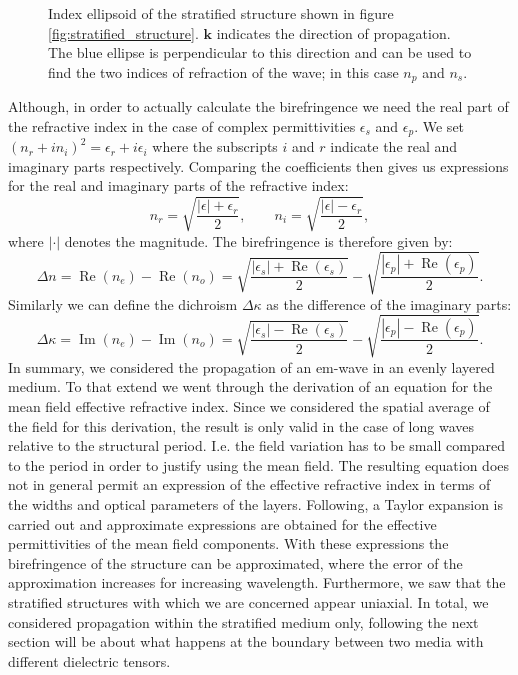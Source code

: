 \begin{figure}[h]
    \centering
    
    \caption{Index ellipsoid of the stratified structure shown in figure \ref{fig:stratified_structure}. $\bm{k}$ indicates the direction of propagation. The blue ellipse is perpendicular to this direction and can be used to find the two indices of refraction of the wave; in this case $n_{p}$ and $n_{s}$.}
    \label{fig:index_ellipse}
\end{figure}
Although, in order to actually calculate the birefringence we need the real part of the refractive index in the case of complex permittivities $\epsilon_{s}$ and $\epsilon_{p}$. We set $(n_r+in_i)^2 = \epsilon_r + i\epsilon_i$ where the subscripts $i$ and $r$ indicate the real and imaginary parts respectively. Comparing the coefficients then gives us expressions for the real and imaginary parts of the refractive index:
\begin{equation}
    n_r = \sqrt{\frac{|\epsilon|+\epsilon_r}{2}}, 
    \qquad 
    n_i = \sqrt{\frac{|\epsilon|-\epsilon_r}{2}},
\end{equation}
where $|\cdot|$ denotes the magnitude. The birefringence is therefore given by:
\begin{equation}
    \Delta n = \operatorname{Re}(n_e) - \operatorname{Re}(n_o) = \sqrt{\frac{|\epsilon_s|+\operatorname{Re}(\epsilon_s)}{2}} - \sqrt{\frac{|\epsilon_p|+\operatorname{Re}(\epsilon_p)}{2}}.
\end{equation}
Similarly we can define the dichroism $\Delta \kappa$ as the difference of the imaginary parts:
\begin{equation}
    \Delta \kappa = \operatorname{Im}(n_e) - \operatorname{Im}(n_o) = \sqrt{\frac{|\epsilon_s|-\operatorname{Re}(\epsilon_s)}{2}} - \sqrt{\frac{|\epsilon_p|-\operatorname{Re}(\epsilon_p)}{2}}.
\end{equation}
In summary, we considered the propagation of an em-wave in an evenly layered medium. To that extend we went through the derivation of an equation for the mean field effective refractive index. Since we considered the spatial average of the field for this derivation, the result is only valid in the case of long waves relative to the structural period. I.e. the field variation has to be small compared to the period in order to justify using the mean field. The resulting equation does not in general permit an expression of the effective refractive index in terms of the widths and optical parameters of the layers. Following, a Taylor expansion is carried out and approximate expressions are obtained for the effective permittivities of the mean field components. With these expressions the birefringence of the structure can be approximated, where the error of the approximation increases for increasing wavelength. Furthermore, we saw that the stratified structures with which we are concerned appear uniaxial. In total, we considered propagation within the stratified medium only, following the next section will be about what happens at the boundary between two media with different dielectric tensors.

